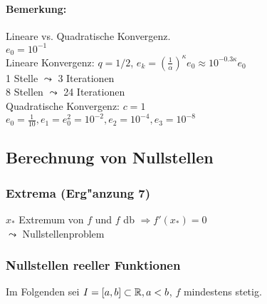 \documentclass{scrartcl}
\begin{document}
\paragraph*{Bemerkung:} Lineare vs. Quadratische Konvergenz. \\
$e_0 = 10^{-1}$ \\
Lineare Konvergenz: $q = 1/2$, $e_k = \left( \frac 1 \alpha \right)^{\kappa} e_0 \approx 10^{-0.3 \kappa} e_0$ \\
1 Stelle $\leadsto$ 3 Iterationen \\
8 Stellen $\leadsto$ 24 Iterationen \\
Quadratische Konvergenz: $c=1$ \\
$e_0 = \frac{1}{10}, e_1 = e_0^2 = 10^{-2}, e_2 = 10^{-4}, e_3 = 10^{-8}$

\subsection{Berechnung von Nullstellen}

\subsubsection{Extrema (Erg"anzung 7)}
$x_*$ Extremum von $f$ und $f$ db
$\Rightarrow f'(x_*) = 0$ \\
$\leadsto$ Nullstellenproblem

\subsubsection{Nullstellen reeller Funktionen}
Im Folgenden sei $I = [a,b] \subset \mathbb{R}, a < b$, $f$ mindestens stetig.
\end{document}
